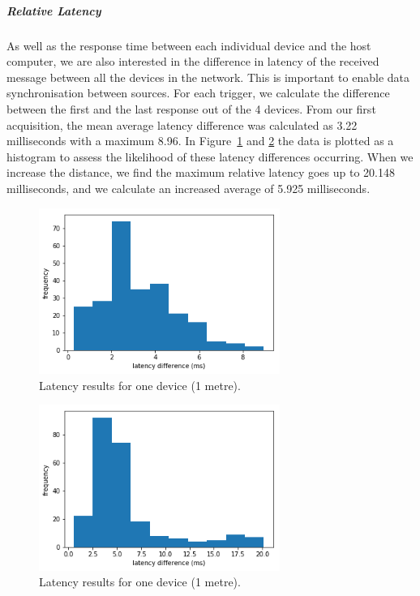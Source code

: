 \subparagraph{Relative Latency}

As well as the response time between each individual device and the host computer, we are also interested in the difference in latency of the received message between all the devices in the network. This is important to enable data synchronisation between sources. For each trigger, we calculate the difference between the first and the last response out of the 4 devices. From our first acquisition, the mean average latency difference was calculated as 3.22 milliseconds with a maximum 8.96. In Figure~\ref{fig:latency_fig6} and \ref{fig:latency_fig7} the data is plotted as a histogram to assess the likelihood of these latency differences occurring. When we increase the distance, we find the maximum relative latency goes up to 20.148 milliseconds, and we calculate an increased average of 5.925 milliseconds.

\begin{figure}[htbp]
  \centering
    \includegraphics[width=0.7\textwidth]{Chapters/Figures/technical/Latency/figure6.png}
    \caption{Latency results for one device (1 metre).}
    \label{fig:latency_fig6}
\end{figure}

\begin{figure}[htbp]
  \centering
    \includegraphics[width=0.7\textwidth]{Chapters/Figures/technical/Latency/figure7.png}
    \caption{Latency results for one device (1 metre).}
    \label{fig:latency_fig7}
\end{figure}

